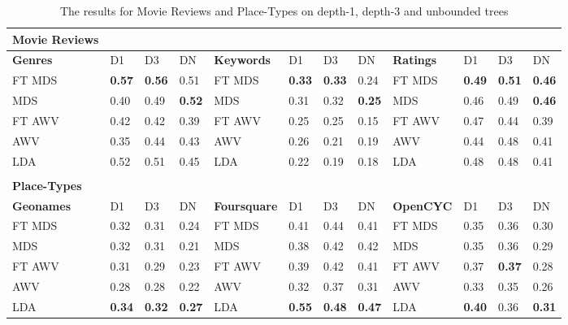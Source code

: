 \begin{table}[t]
	\centering
	\small
	\setlength{\tabcolsep}{4.4pt}
	\renewcommand{\arraystretch}{1.1}
	\begin{tabularx}{\textwidth}{llllllllllll}
		\textbf{Movie Reviews} &      &      &      &            &      &      &      &                &      &      &      \\
		\toprule{}
		\textbf{Genres}        & D1   & D3   & DN   & \textbf{Keywords}   & D1   & D3   & DN   & \textbf{Ratings}        & D1   & D3   & DN   \\
		\midrule{}FT MDS        & \textbf{0.57} & \textbf{0.56} & 0.51 & FT MDS     & \textbf{0.33} & \textbf{0.33} & 0.24 & FT MDS         & \textbf{0.49} & \textbf{0.51} & \textbf{0.46} \\
		MDS           & 0.40 & 0.49 & \textbf{0.52} & MDS        & 0.31 & 0.32 & \textbf{0.25} & MDS            & 0.46 & 0.49 & \textbf{0.46} \\
		FT AWV        & 0.42 & 0.42 & 0.39 & FT AWV     & 0.25 & 0.25 & 0.15 & FT AWV         & 0.47 & 0.44 & 0.39 \\
		AWV           & 0.35 & 0.44 & 0.43 & AWV        & 0.26 & 0.21 & 0.19 & AWV            & 0.44 & 0.48 & 0.41 \\
		LDA           & 0.52 & 0.51 & 0.45 & LDA        & 0.22 & 0.19 & 0.18 & LDA            & 0.48 & 0.48 & 0.41 \\
		&      &      &      &            &      &      &      &                &      &      &      \\
	
		\textbf{Place-Types}   &      &      &      &            &      &      &      &                &      &      &      \\
		\toprule{}
		\textbf{Geonames}      & D1   & D3   & DN   & \textbf{Foursquare} & D1   & D3   & DN   & \textbf{OpenCYC}        & D1   & D3   & DN   \\
		\midrule{}FT MDS        & 0.32 & 0.31 & 0.24 & FT MDS     & 0.41 & 0.44 & 0.41 & FT MDS         & 0.35 & 0.36 & 0.30 \\
		MDS           & 0.32 & 0.31 & 0.21 & MDS        & 0.38 & 0.42 & 0.42 & MDS            & 0.35 & 0.36 & 0.29 \\
		FT AWV        & 0.31 & 0.29 & 0.23 & FT AWV     & 0.39 & 0.42 & 0.41 & FT AWV         & 0.37 & \textbf{0.37} & 0.28 \\
		AWV           & 0.28 & 0.28 & 0.22 & AWV        & 0.32 & 0.37 & 0.31 & AWV            & 0.33 & 0.35 & 0.26 \\
		LDA           & \textbf{0.34} & \textbf{0.32} & \textbf{0.27} & LDA        & \textbf{0.55} & \textbf{0.48} & \textbf{0.47} & LDA            & \textbf{0.40} & 0.36 & \textbf{0.31} \\
		
	\end{tabularx}
	
	\caption{The results for Movie Reviews and Place-Types on depth-1, depth-3 and unbounded trees\label{tabResultsMoviePlaces}}
\end{table}

